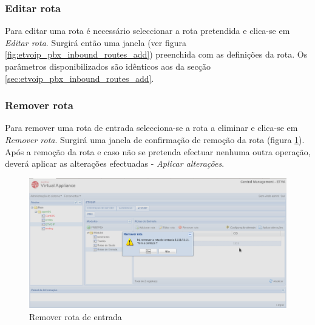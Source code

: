 \subsubsection{Editar rota}

Para editar uma rota é necessário seleccionar a rota pretendida e clica-se em \emph{Editar rota}. Surgirá então uma janela (ver figura \ref{fig:etvoip_pbx_inbound_routes_add}) preenchida com as definições da rota.
Os parâmetros disponibilizados são idênticos aos da secção \ref{sec:etvoip_pbx_inbound_routes_add}.

\subsubsection{Remover rota}

Para remover uma rota de entrada selecciona-se a rota a eliminar e clica-se em \emph{Remover rota}.
Surgirá uma janela de confirmação de remoção da rota (figura \ref{fig:etvoip_pbx_inbound_routes_remove}). Após a remoção da rota e caso não se pretenda efectuar nenhuma outra operação, deverá aplicar as alterações efectuadas - \emph{Aplicar alterações}.

\begin{figure}[H]
        \begin{center}
        \includegraphics[scale=0.4]{screenshots/etvoip_pbx_inbound_routes_remove.png}
        \caption{Remover rota de entrada}
        \label{fig:etvoip_pbx_inbound_routes_remove}
        \end{center}
\end{figure}

